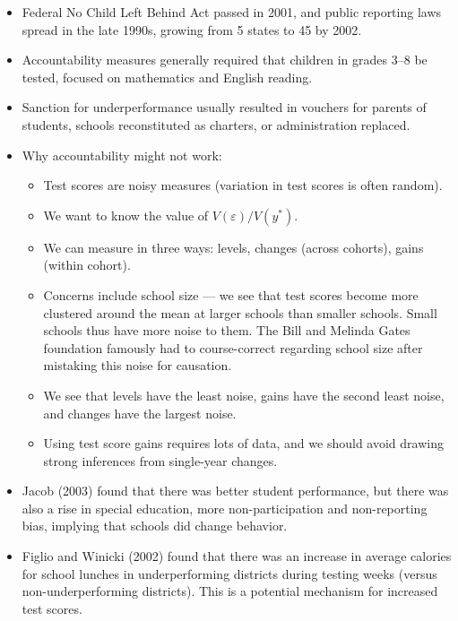 \documentclass[10pt]{extarticle}
\begin{document}
\begin{itemize}
\begin{itemize}
      \end{itemize}
    \item Federal No Child Left Behind Act passed in 2001, and public reporting laws spread in the late 1990s, growing from 5 states to 45 by 2002.
    \item Accountability measures generally required that children in grades 3--8 be tested, focused on mathematics and English reading.
    \item Sanction for underperformance usually resulted in vouchers for parents of students, schools reconstituted as charters, or administration replaced.
    \item Why accountability might not work:
      \begin{itemize}
        \item Test scores are noisy measures (variation in test scores is often random).
        \item We want to know the value of $V(\varepsilon)/V(y^{\ast})$.
        \item We can measure in three ways: levels, changes (across cohorts), gains (within cohort).
        \item Concerns include school size --- we see that test scores become more clustered around the mean at larger schools than smaller schools. Small schools thus have more noise to them. The Bill and Melinda Gates foundation famously had to course-correct regarding school size after mistaking this noise for causation.
        \item We see that levels have the least noise, gains have the second least noise, and changes have the largest noise.
        \item Using test score gains requires lots of data, and we should avoid drawing strong inferences from single-year changes.
      \end{itemize}
    \item Jacob (2003) found that there was better student performance, but there was also a rise in special education, more non-participation and non-reporting bias, implying that schools did change behavior.
    \item Figlio and Winicki (2002) found that there was an increase in average calories for school lunches in underperforming districts during testing weeks (versus non-underperforming districts). This is a potential mechanism for increased test scores.
  \end{itemize}
\end{document}

